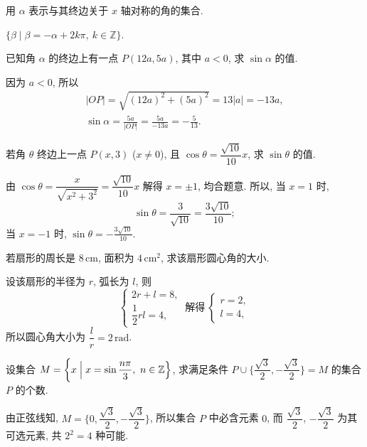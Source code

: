 \begin{exercise}
    用 $\alpha$ 表示与其终边关于 $x$ 轴对称的角的集合.
\end{exercise}
\beginsolution
    $\{\beta\mid \beta= -\alpha+ 2k\pi,\ k\in\mathbb{Z}\}$.
\endsolution

\begin{exercise}
    已知角 $\alpha$ 的终边上有一点 $P(12a,5a)$, 其中 $a<0$, 
    求 $\sin\alpha$ 的值.
\end{exercise}
\beginsolution
    因为 $a<0$, 所以
    \[\begin{gathered}
        |OP|= \sqrt{(12a)^2+ (5a)^2}= 13|a|= -13a,\\
        \sin\alpha= \frac{5a}{|OP|}= \frac{5a}{-13a}
            = -\frac{5}{13}.
    \end{gathered}\]
\endsolution

\begin{exercise}
    若角 $\theta$ 终边上一点 $P(x,3)$ ($x\neq 0$), 
    且 $\cos\theta = \dfrac{\sqrt{10}}{10} x$, 求 $\sin\theta$ 的值.
\end{exercise}
\beginsolution
    由 $\cos\theta= \dfrac{x}{\sqrt{x^2+3^2}}= \dfrac{\sqrt{10}}{10} x$ 解得 $x=\pm1$, 均合题意. 所以, 当 $x=1$ 时,
    \[\sin\theta= \dfrac{3}{\sqrt{10}}= \frac{3\sqrt{10}}{10};\]
    当 $x=-1$ 时, $\sin\theta= -\frac{3\sqrt{10}}{10}$.
\endsolution

\begin{exercise}
    若扇形的周长是 $8\,\mathrm{cm}$, 面积为 $4\,\text{cm}^2$, 
    求该扇形圆心角的大小.
\end{exercise}
\beginsolution
    设该扇形的半径为 $r$, 弧长为 $l$, 则
    \[\left\{\!\!\begin{array}{l}
        2r+l= 8,\\
        \dfrac12rl= 4,
    \end{array}\right.\ \text{解得}\ 
    \left\{\!\!\begin{array}{l}
        r=2,\\
        l=4,
    \end{array}\right.\]
    所以圆心角大小为 $\dfrac{l}r= 2\,\mathrm{rad}$.
\endsolution

\begin{exercise}
    设集合 $M=\biggl\{x\Bigm| x=\sin\dfrac{n\pi}3,\ n\in\mathbb{Z}\Big\}$, 求满足条件 $P\cup\biggl\{\dfrac{\sqrt3}2, -\dfrac{\sqrt3}2\biggr\}=M$ 的集合 $P$ 的个数.
\end{exercise}
\beginsolution
    由正弦线知, 
    $M=\biggl\{0,\dfrac{\sqrt3}2,-\dfrac{\sqrt3}2\biggr\}$, 所以集合 $P$ 中必含元素 $0$, 而 $\dfrac{\sqrt3}2$, $-\dfrac{\sqrt3}2$ 为其可选元素, 共 $2^2=4$ 种可能.

